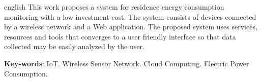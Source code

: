 \begin{resumo}[Abstract]
 \begin{otherlanguage*}{english}
   This work proposes a system for residence energy consumption monitoring with a low investment cost. The system consists of devices connected by a wireless network and a Web application. The proposed system uses services, resources and tools that converges to a user friendly interface so that data collected may be easily analyzed by the user.

   \vspace{\onelineskip}
 
   \noindent 
   \textbf{Key-words}: IoT. Wireless Sensor Network. Cloud Computing. Electric Power Consumption.
 \end{otherlanguage*}
\end{resumo}